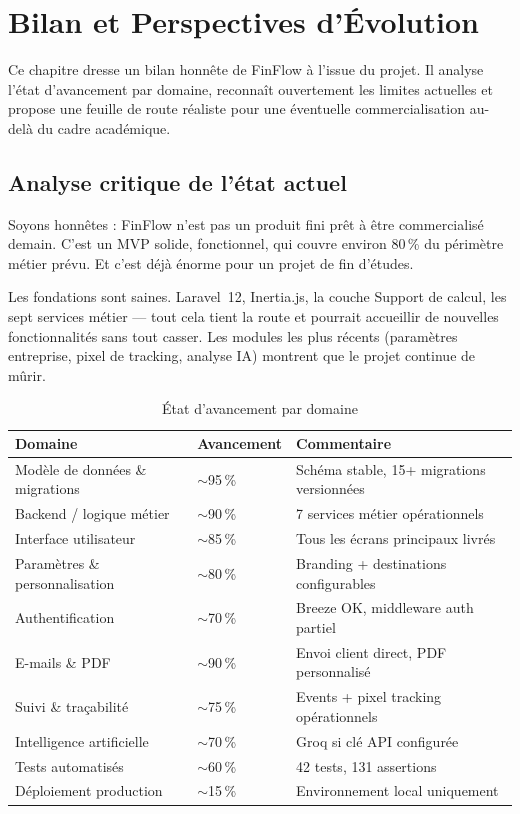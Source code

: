 \documentclass[12pt,a4paper]{report}
\begin{document}
\chapter{Bilan et Perspectives d'Évolution}
\label{ch:bilan}

Ce chapitre dresse un bilan honnête de FinFlow à l'issue du projet. Il analyse l'état d'avancement par domaine, reconnaît ouvertement les limites actuelles et propose une feuille de route réaliste pour une éventuelle commercialisation au-delà du cadre académique.

\section{Analyse critique de l'état actuel}

Soyons honnêtes : FinFlow n'est pas un produit fini prêt à être commercialisé demain. C'est un MVP solide, fonctionnel, qui couvre environ 80\,\% du périmètre métier prévu. Et c'est déjà énorme pour un projet de fin d'études.

Les fondations sont saines. Laravel~12, Inertia.js, la couche Support de calcul, les sept services métier --- tout cela tient la route et pourrait accueillir de nouvelles fonctionnalités sans tout casser. Les modules les plus récents (paramètres entreprise, pixel de tracking, analyse IA) montrent que le projet continue de mûrir.

\begin{table}[H]
\centering
\caption{État d'avancement par domaine}
\begin{tabular}{@{}lll@{}}
\toprule
\textbf{Domaine} & \textbf{Avancement} & \textbf{Commentaire} \\
\midrule
Modèle de données \& migrations & $\sim$95\,\% & Schéma stable, 15+ migrations versionnées \\
Backend / logique métier & $\sim$90\,\% & 7 services métier opérationnels \\
Interface utilisateur & $\sim$85\,\% & Tous les écrans principaux livrés \\
Paramètres \& personnalisation & $\sim$80\,\% & Branding + destinations configurables \\
Authentification & $\sim$70\,\% & Breeze OK, middleware auth partiel \\
E-mails \& PDF & $\sim$90\,\% & Envoi client direct, PDF personnalisé \\
Suivi \& traçabilité & $\sim$75\,\% & Events + pixel tracking opérationnels \\
Intelligence artificielle & $\sim$70\,\% & Groq si clé API configurée \\
Tests automatisés & $\sim$60\,\% & 42 tests, 131 assertions \\
Déploiement production & $\sim$15\,\% & Environnement local uniquement \\
\bottomrule
\end{tabular}
\end{table}
\end{document}
